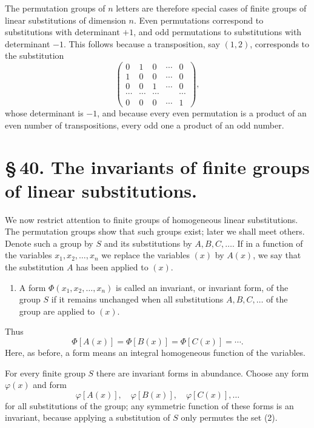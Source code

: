 \documentclass[11pt]{article}
\begin{document}
The permutation groups of $n$ letters are therefore special cases of finite groups of linear substitutions of dimension $n$. Even permutations correspond to substitutions with determinant $+1$, and odd permutations to substitutions with determinant $-1$. This follows because a transposition, say $(1,2)$, corresponds to the substitution
\[
\begin{pmatrix}
0&1&0&\cdots&0\\
1&0&0&\cdots&0\\
0&0&1&\cdots&0\\
\cdots&\cdots&\cdots&&\cdots\\
0&0&0&\cdots&1
\end{pmatrix},
\]
whose determinant is $-1$, and because every even permutation is a product of an even number of transpositions, every odd one a product of an odd number.

\section*{\S\,40. The invariants of finite groups of linear substitutions.}

We now restrict attention to finite groups of homogeneous linear substitutions. The permutation groups show that such groups exist; later we shall meet others. Denote such a group by $S$ and its substitutions by $A,B,C,\ldots$. If in a function of the variables $x_1,x_2,\ldots,x_n$ we replace the variables $(x)$ by $A(x)$, we say that the substitution $A$ has been applied to $(x)$.

\begin{enumerate}[label=\arabic*.,leftmargin=2.2em]
\item A form $\Phi(x_1,x_2,\ldots,x_n)$ is called an invariant, or invariant form, of the group $S$ if it remains unchanged when all substitutions $A,B,C,\ldots$ of the group are applied to $(x)$.
\end{enumerate}
Thus
\begin{equation}
\Phi[A(x)]=\Phi[B(x)]=\Phi[C(x)]=\cdots.
\tag{1}
\end{equation}
Here, as before, a form means an integral homogeneous function of the variables.

For every finite group $S$ there are invariant forms in abundance. Choose any form $\varphi(x)$ and form
\begin{equation}
\varphi[A(x)],\quad\varphi[B(x)],\quad\varphi[C(x)],\ldots
\tag{2}
\end{equation}
for all substitutions of the group; any symmetric function of these forms is an invariant, because applying a substitution of $S$ only permutes the set (2).
\end{document}
